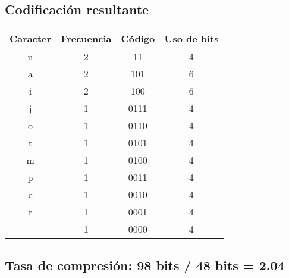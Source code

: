 \documentclass{article}
\begin{document}
\begin{center}
		
		\subsection*{Codificación resultante}
		\begin{tabular}{c|c|c|c}
			\textbf{Caracter} & \textbf{Frecuencia} & \textbf{Código} & \textbf{Uso de bits}\\
			\hline
			n & 2 & 11 & 4\\
			a & 2 & 101 & 6\\
			i & 2 & 100 & 6\\
			j & 1 & 0111 & 4\\
			o & 1 & 0110 & 4\\
			t & 1 & 0101 & 4\\
			m & 1 & 0100 & 4\\  
			p & 1 & 0011 & 4\\
			e & 1 & 0010 & 4\\
			r & 1 & 0001 & 4\\
			  & 1 & 0000 & 4\\
		\end{tabular}
		\subsection*{Tasa de compresión: 98 bits / 48 bits = 2.04}	
	\end{center}
	
	
	
	
	
	
	
	
	
	
	
	
	
	
	
	
	
	
	
	
	
\end{document}
